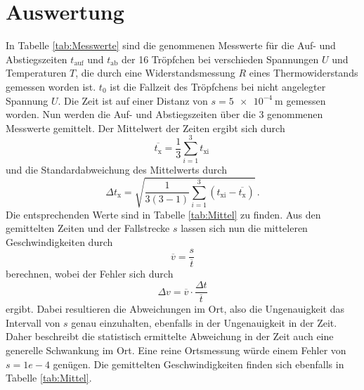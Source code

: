 \section{Auswertung}
In Tabelle \ref{tab:Messwerte} sind die genommenen Messwerte für die Auf- und Abstiegszeiten
$t_{\text{auf}}$ und $t_{\text{ab}}$ der 16 Tröpfchen bei verschieden Spannungen $U$ und Temperaturen $T$,
die durch eine Widerstandsmessung $R$ eines Thermowiderstands gemessen worden ist. $t_0$ ist die
Fallzeit des Tröpfchens bei nicht angelegter Spannung $U$. Die Zeit ist auf einer Distanz von $s=\qty{5e-4}{\meter}$
gemessen worden. Nun werden die Auf- und Abstiegszeiten über die 3 genommenen Messwerte gemittelt. Der Mittelwert der Zeiten ergibt sich durch
\begin{equation}\label{eq:mean}
    \overline{t_\text{x}}=\frac{1}{3}\sum_{i=1}^3t_\text{xi}\,
\end{equation}
und die Standardabweichung des Mittelwerts durch
\begin{equation}\label{eq:std}
    \Delta{t_\text{x}}=\sqrt{\frac{1}{3(3-1)}\sum_{i=1}^3\left(t_\text{xi}-\overline{t_\text{x}}\right)}\,.
\end{equation}
Die entsprechenden Werte sind in Tabelle \ref{tab:Mittel} zu finden.
Aus den gemittelten Zeiten und der Fallstrecke $s$ lassen sich nun die mitteleren Geschwindigkeiten
durch 
\begin{equation}\label{eq:v}
    \overline{v}=\frac{s}{\overline{t}}
\end{equation}
berechnen, wobei der Fehler sich durch 
\begin{equation}\label{eq:dv}
    \Delta{v}=\overline{v}\cdot \frac{\Delta t}{\overline{t}}
\end{equation}
ergibt. Dabei resultieren die Abweichungen im Ort, also die Ungenauigkeit das Intervall von $s$ genau einzuhalten, ebenfalls in der Ungenauigkeit in der Zeit. Daher beschreibt die statistisch ermittelte
Abweichung in der Zeit auch eine generelle Schwankung im Ort. Eine reine Ortsmessung würde einem Fehler
von $s=1e-4$ genügen. Die gemittelten Geschwindigkeiten finden sich ebenfalls in Tabelle \ref{tab:Mittel}. 
\label{sec:Auswertung}
